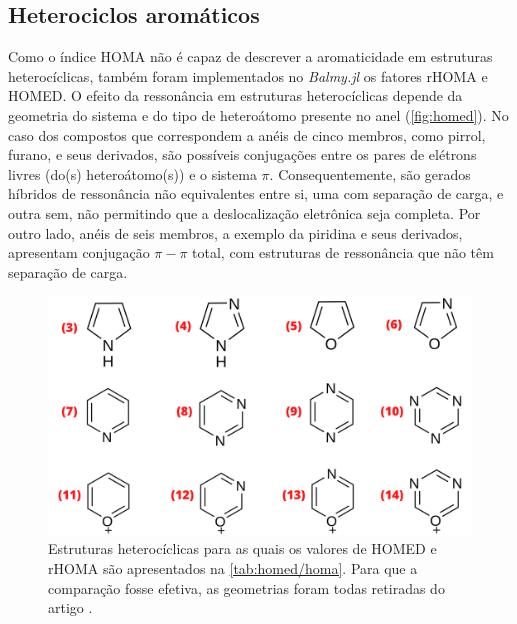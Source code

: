 \subsection{Heterociclos aromáticos}

Como o índice \gls{HOMA} não é capaz de descrever a aromaticidade em estruturas heterocíclicas, também foram implementados no \textit{Balmy.jl} os fatores \gls{rHOMA} e \gls{HOMED}. O efeito da ressonância em estruturas heterocíclicas depende da geometria do sistema e do tipo de heteroátomo presente no anel (\autoref{fig:homed}). No caso dos compostos que correspondem a anéis de cinco membros, como pirrol, furano, e seus derivados, são possíveis conjugações entre os pares de elétrons livres (do(s) heteroátomo(s)) e o sistema $\pi$. Consequentemente, são gerados híbridos de ressonância não equivalentes entre si, uma com separação de carga, e outra sem, não permitindo que a deslocalização eletrônica seja completa. Por outro lado, anéis de seis membros, a exemplo da piridina e seus derivados, apresentam conjugação $\pi-\pi$ total, com estruturas de ressonância que não têm separação de carga.

\begin{figure}[htb]
\caption{\label{fig:homed} Estruturas heterocíclicas para as quais os valores de \gls{HOMED} e \gls{rHOMA} são apresentados na \autoref{tab:homed/homa}. Para que a comparação fosse efetiva, as geometrias foram todas retiradas do artigo \cite{giov2020}.}
	\begin{center}
		\includegraphics[width=1.0\textwidth]{images/17.png}
	\end{center}
\end{figure}

